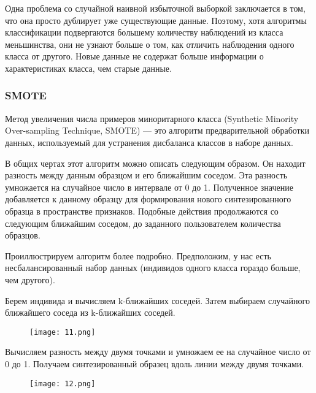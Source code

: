 \documentclass{article}
\begin{document}
	Одна проблема со случайной наивной избыточной выборкой заключается в том, что она просто дублирует уже существующие данные. Поэтому, хотя алгоритмы классификации подвергаются большему количеству наблюдений из класса меньшинства, они не узнают больше о том, как отличить наблюдения одного класса от другого. Новые данные не содержат больше информации о характеристиках класса, чем старые данные.
	
	\subsubsection{SMOTE}
	
	Метод увеличения числа примеров миноритарного класса (Synthetic Minority Over-sampling Technique, SMOTE) — это алгоритм предварительной обработки данных, используемый для устранения дисбаланса классов в наборе данных.
	
	В общих чертах этот алгоритм можно описать следующим образом.
	Он находит разность между данным образцом и его ближайшим соседом.
	Эта разность умножается на случайное число в интервале от 0 до 1.
	Полученное значение добавляется к данному образцу для формирования нового синтезированного образца в пространстве признаков.
	Подобные действия продолжаются со следующим ближайшим соседом, до заданного пользователем количества образцов.
	
	Проиллюстрируем алгоритм более подробно. Предположим, у нас есть несбалансированный набор данных (индивидов одного класса гораздо больше, чем другого).
	
	Берем индивида и вычисляем k-ближайших соседей. Затем выбираем случайного ближайшего соседа из k-ближайших соседей.
	
	\begin{figure}[hhh!]
		\begin{center}
			\texttt{[image: 11.png]}
		\end{center}
		\vspace{-5mm}
	\end{figure}

	Вычисляем разность между двумя точками и умножаем ее на случайное число от 0 до 1. Получаем синтезированный образец вдоль линии между двумя точками.
	
	\begin{figure}[hhh!]
		\begin{center}
			\texttt{[image: 12.png]}
		\end{center}
		\vspace{-5mm}
	\end{figure}
\end{document}
